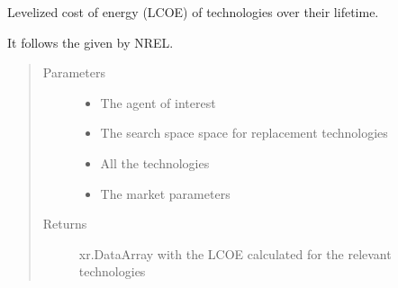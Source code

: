 \documentclass[letterpaper,10pt,english]{sphinxmanual}
\begin{document}
\begin{fulllineitems}
\label{\detokenize{api:muse.objectives.lifetime_levelized_cost_of_energy}}
Levelized cost of energy (LCOE) of technologies over their lifetime.

It follows the  given by NREL.
\begin{quote}\begin{description}
\item[{Parameters}] \leavevmode\begin{itemize}
\item {} 
 \textendash{} The agent of interest

\item {} 
 \textendash{} The search space space for replacement technologies

\item {} 
 \textendash{} All the technologies

\item {} 
 \textendash{} The market parameters

\end{itemize}

\item[{Returns}] \leavevmode
xr.DataArray with the LCOE calculated for the relevant technologies

\end{description}\end{quote}

\end{fulllineitems}

\end{document}
